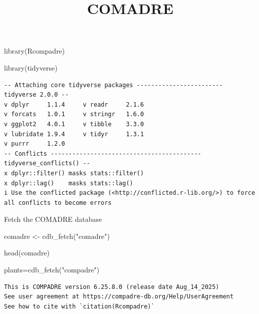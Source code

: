 \documentclass[
  12pt,
  letterpaper,
]{book}
\title{COMADRE}
\author{}
\date{}
\newenvironment{Shaded}{\begin{snugshade}}{\end{snugshade}}
\newcommand{\FunctionTok}[1]{\textcolor[rgb]{0.28,0.35,0.67}{#1}}
\newcommand{\NormalTok}[1]{\textcolor[rgb]{0.00,0.23,0.31}{#1}}
\newcommand{\OtherTok}[1]{\textcolor[rgb]{0.00,0.23,0.31}{#1}}
\newcommand{\StringTok}[1]{\textcolor[rgb]{0.13,0.47,0.30}{#1}}
\renewcommand*\contentsname{Table of contents}
\newcommand\contentsname{Table of contents}
\begin{document}
\frontmatter
\maketitle

\renewcommand*\contentsname{Table of contents}
{
\hypersetup{linkcolor=}
\setcounter{tocdepth}{2}
\tableofcontents
}

\mainmatter
\begin{Shaded}
\begin{Highlighting}[]
\FunctionTok{library}\NormalTok{(Rcompadre)}

\FunctionTok{library}\NormalTok{(tidyverse)}
\end{Highlighting}
\end{Shaded}

\begin{verbatim}
-- Attaching core tidyverse packages ------------------------ tidyverse 2.0.0 --
v dplyr     1.1.4     v readr     2.1.6
v forcats   1.0.1     v stringr   1.6.0
v ggplot2   4.0.1     v tibble    3.3.0
v lubridate 1.9.4     v tidyr     1.3.1
v purrr     1.2.0     
-- Conflicts ------------------------------------------ tidyverse_conflicts() --
x dplyr::filter() masks stats::filter()
x dplyr::lag()    masks stats::lag()
i Use the conflicted package (<http://conflicted.r-lib.org/>) to force all conflicts to become errors
\end{verbatim}

Fetch the COMADRE database

\begin{Shaded}
\begin{Highlighting}[]
\NormalTok{comadre }\OtherTok{\textless{}{-}} \FunctionTok{cdb\_fetch}\NormalTok{(}\StringTok{"comadre"}\NormalTok{)}

\FunctionTok{head}\NormalTok{(comadre)}
\end{Highlighting}
\end{Shaded}

\begin{Shaded}
\begin{Highlighting}[]
\NormalTok{plants}\OtherTok{=}\FunctionTok{cdb\_fetch}\NormalTok{(}\StringTok{"compadre"}\NormalTok{)}
\end{Highlighting}
\end{Shaded}

\begin{verbatim}
This is COMPADRE version 6.25.8.0 (release date Aug_14_2025)
See user agreement at https://compadre-db.org/Help/UserAgreement
See how to cite with `citation(Rcompadre)`
\end{verbatim}
\end{document}
